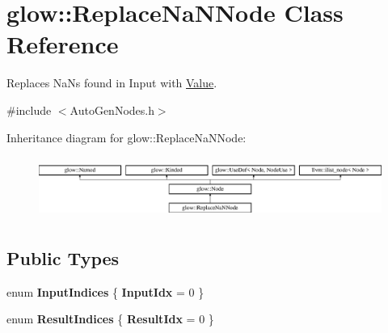 \hypertarget{classglow_1_1_replace_na_n_node}{}\section{glow\+:\+:Replace\+Na\+N\+Node Class Reference}
\label{classglow_1_1_replace_na_n_node}


Replaces Na\+Ns found in Input with \hyperlink{classglow_1_1_value}{Value}.  




{\ttfamily \#include $<$Auto\+Gen\+Nodes.\+h$>$}

Inheritance diagram for glow\+:\+:Replace\+Na\+N\+Node\+:\begin{figure}[H]
\begin{center}
\leavevmode
\includegraphics[height=2.028986cm]{classglow_1_1_replace_na_n_node}
\end{center}
\end{figure}
\subsection*{Public Types}
\begin{DoxyCompactItemize}
\item 
\mbox{\label{classglow_1_1_replace_na_n_node_a2c606754f473e987e8000c036ad95735}} 
enum {\bfseries Input\+Indices} \{ {\bfseries Input\+Idx} = 0
 \}
\item 
\mbox{\label{classglow_1_1_replace_na_n_node_a16203a933fa69ee7709ae3fe8019eca2}} 
enum {\bfseries Result\+Indices} \{ {\bfseries Result\+Idx} = 0
 \}
\end{DoxyCompactItemize}
